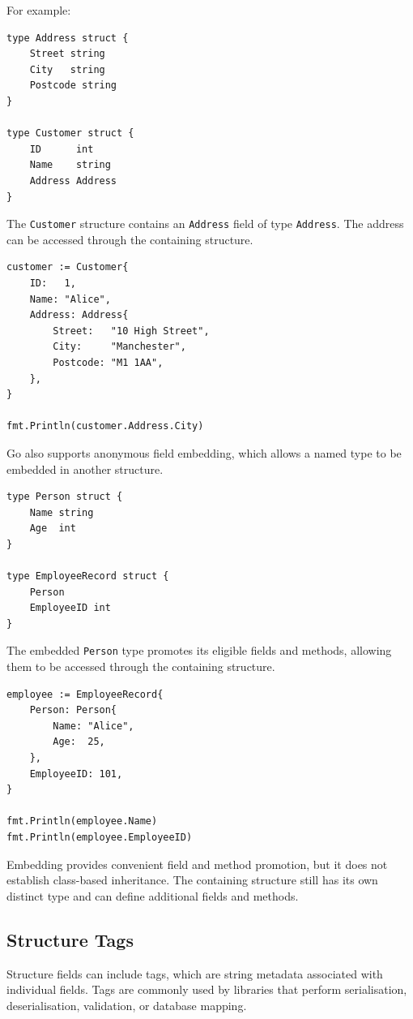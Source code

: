 For example:

\begin{lstlisting}
type Address struct {
    Street string
    City   string
    Postcode string
}

type Customer struct {
    ID      int
    Name    string
    Address Address
}
\end{lstlisting}

The \texttt{Customer} structure contains an \texttt{Address} field of type \texttt{Address}. The address can be accessed through the containing structure.

\begin{lstlisting}
customer := Customer{
    ID:   1,
    Name: "Alice",
    Address: Address{
        Street:   "10 High Street",
        City:     "Manchester",
        Postcode: "M1 1AA",
    },
}

fmt.Println(customer.Address.City)
\end{lstlisting}

Go also supports anonymous field embedding, which allows a named type to be embedded in another structure.

\begin{lstlisting}
type Person struct {
    Name string
    Age  int
}

type EmployeeRecord struct {
    Person
    EmployeeID int
}
\end{lstlisting}

The embedded \texttt{Person} type promotes its eligible fields and methods, allowing them to be accessed through the containing structure.

\begin{lstlisting}
employee := EmployeeRecord{
    Person: Person{
        Name: "Alice",
        Age:  25,
    },
    EmployeeID: 101,
}

fmt.Println(employee.Name)
fmt.Println(employee.EmployeeID)
\end{lstlisting}

Embedding provides convenient field and method promotion, but it does not establish class-based inheritance. The containing structure still has its own distinct type and can define additional fields and methods.

\subsection{Structure Tags}

Structure fields can include tags, which are string metadata associated with individual fields. Tags are commonly used by libraries that perform serialisation, deserialisation, validation, or database mapping.


